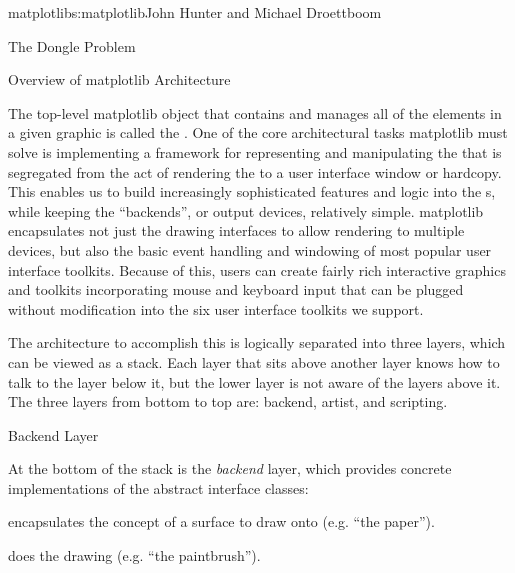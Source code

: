 \begin{aosachapter}{matplotlib}{s:matplotlib}{John Hunter and Michael Droettboom}
\begin{aosasect1}{The Dongle Problem}

\end{aosasect1}

\begin{aosasect1}{Overview of matplotlib Architecture}

The top-level matplotlib object that contains and manages all of the
elements in a given graphic is called the .  One of the
core architectural tasks matplotlib must solve is implementing a
framework for representing and manipulating the  that
is segregated from the act of rendering the  to a user
interface window or hardcopy.  This enables us to build increasingly
sophisticated features and logic into the s, while
keeping the ``backends'', or output devices, relatively simple.
matplotlib encapsulates not just the drawing interfaces to allow
rendering to multiple devices, but also the basic event
handling and windowing of most popular user interface toolkits.
Because of this, users can create fairly rich interactive graphics
and toolkits incorporating mouse and keyboard input that can be
plugged without modification into the six user interface toolkits we support.

The architecture to accomplish this is logically separated into three
layers, which can be viewed as a stack.  Each layer that sits above
another layer knows how to talk to the layer below it, but the lower
layer is not aware of the layers above it.  The three layers from
bottom to top are: backend, artist, and scripting.


\begin{aosasect2}{Backend Layer}

At the bottom of the stack is the \emph{backend} layer, which provides
concrete implementations of the abstract interface classes:
\begin{aosaitemize}
\item {} encapsulates the concept of a surface to draw
  onto (e.g. ``the paper'').

\item {} does the drawing (e.g. ``the paintbrush'').


\end{aosaitemize}
\end{aosasect2}
\end{aosasect1}
\end{aosachapter}
